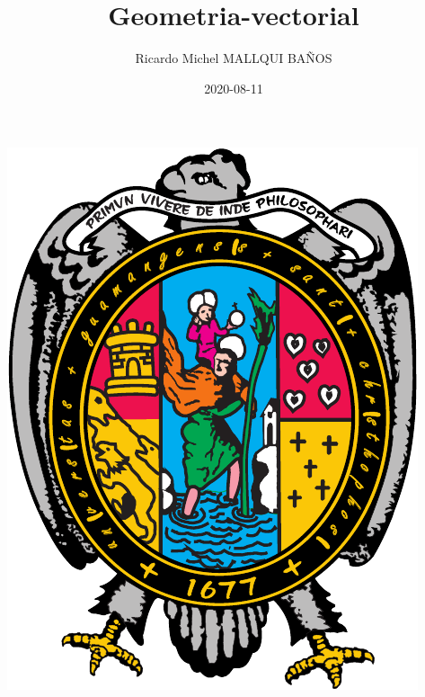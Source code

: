 \documentclass[10pt,]{krantz}
\title{Geometria-vectorial}
\author{Ricardo Michel MALLQUI BAÑOS}
\institute{Universidad Nacional San Cristóbal De Huamanga}
\date{2020-08-11}
\let\oldincludegraphics\includegraphics
\renewcommand\includegraphics[2][]{%
  \oldincludegraphics[scale=0.85]{#2}
}
\theoremstyle{definition}
\theoremstyle{definition}
\theoremstyle{definition}
\theoremstyle{remark}
\begin{document}
\maketitle

\thispagestyle{empty}
\begin{center}
\includegraphics{U.pdf}
\end{center}


{
\hypersetup{linkcolor=}
\setcounter{tocdepth}{2}
\tableofcontents
}
\listoftables
\listoffigures
\newcommand{\N}{\mathbb{N}}
\newcommand{\R}{\mathbb{R}}
\newcommand{\CC}{\mathbb{C}}
\newcommand{\I}{\mathbb{I}}
\newcommand{\f}{\mathbb{f}}
\newcommand{\X}{\mathbb{X}}
\newcommand{\D}{\mathbb{D}}
\newcommand{\Z}{\mathbb{Z}}
\newcommand{\Q}{\mathbb{Q}}
\newcommand{\norm}[1]{\left\Vert#1\right\Vert}
\newcommand{\abs}[1]{\left\vert#1\right\vert}
\newcommand{\set}[1]{\left\{#1\right\}}
\newcommand{\seq}[1]{\left<#1\right>}
\newcommand{\co}[1]{\left[#1\right]}
\newcommand{\cc}[1]{\left(#1\right)}
\newcommand{\J}{\mathcal{J}}
\newcommand{\K}{\mathcal{K}}
\newcommand{\M}{\mathcal{M}}
\newcommand{\F}{\mathcal{F}}
\end{document}
